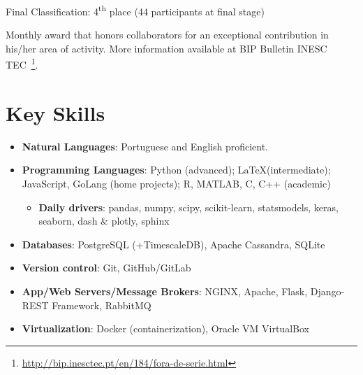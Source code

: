 \documentclass{mycv}
\begin{document}
{\begin{myitemize}
	\item Final Classification: 4\textsuperscript{th} place (44 participants at final stage)
\end{myitemize}



Monthly award that honors collaborators for an exceptional contribution in his/her area of activity. More information available at BIP Bulletin INESC TEC~\footnote{\url{http://bip.inesctec.pt/en/184/fora-de-serie.html}}.


\vspace{0.3cm}

\section{Key Skills}

\begin{itemize}[itemsep=1px]
	
	\item \textbf{Natural Languages}: Portuguese and English proficient.
	
	\item \textbf{Programming Languages}: Python (advanced); \LaTeX (intermediate); JavaScript, GoLang (home projects); R, MATLAB, C, C++ (academic)
	
	\begin{itemize}
		\item \textbf{Daily drivers}: pandas, numpy, scipy, scikit-learn, statsmodels, keras, seaborn, dash \& plotly, sphinx
	\end{itemize}
	
		
	\item \textbf{Databases}: PostgreSQL (+TimescaleDB), Apache Cassandra, SQLite
	
	\item \textbf{Version control}: Git, GitHub/GitLab
		
	\item \textbf{App/Web Servers/Message Brokers}: NGINX, Apache, Flask, Django-REST Framework, RabbitMQ
	
	\item \textbf{Virtualization}: Docker (containerization), Oracle VM VirtualBox
	

\end{itemize}}
\end{document}
